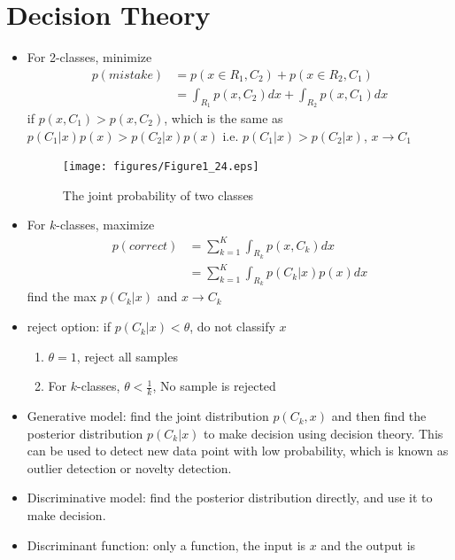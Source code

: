 \documentclass[12pt, a4paper]{article}
\begin{document}
    \section{Decision Theory}
    \begin{itemize}
        \item For 2-classes, minimize
        \begin{align*}
            p(mistake)&=p(x\in R_1,C_2)+p(x\in R_2, C_1)\\
            &=\int_{R_1}p(x,C_2)dx+\int_{R_2}p(x,C_1)dx
        \end{align*}
        if $p(x,C_1)>p(x,C_2)$, which is the same as $p(C_1|x)p(x)>p(C_2|x)p(x)$ i.e. 
        $p(C_1|x)>p(C_2|x)$, $x\rightarrow C_1$
        \begin{figure}[ht]
            \begin{center}
                \texttt{[image: figures/Figure1\_24.eps]}
                \caption{The joint probability of two classes}
            \end{center}
        \end{figure}
        \item For $k$-classes, maximize
        \begin{align*}
            p(correct)&=\sum_{k=1}^K\int_{R_k}p(x,C_k)dx\\
            &=\sum_{k=1}^K\int_{R_k}p(C_k|x)p(x)dx
        \end{align*}
        find the max $p(C_k|x)$ and $x\rightarrow C_k$
        \item reject option: if $p(C_k|x)<\theta$, do not classify $x$
        \begin{enumerate}
            \item $\theta=1$, reject all samples
            \item For $k$-classes, $\theta<\frac{1}{k}$, No sample is rejected
        \end{enumerate}
        \item Generative model: find the joint distribution $p(C_k,x)$ and then find
        the posterior distribution $p(C_k|x)$ to make decision using decision theory. 
        This can be used to detect new data point with low probability, which is known
        as outlier detection or novelty detection.
        \item Discriminative model: find the posterior distribution directly, and use 
        it to make decision.
        \item Discriminant function: only a function, the input is $x$ and the output is

\end{itemize}
\end{document}
